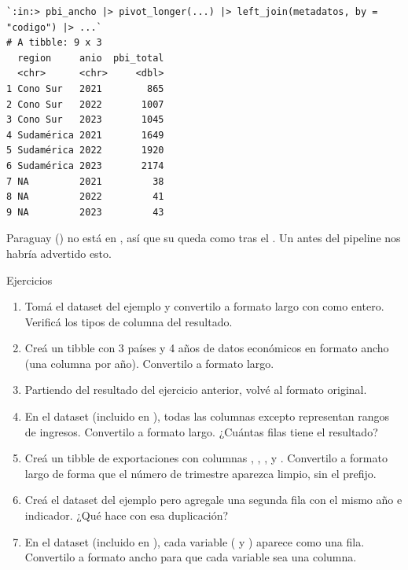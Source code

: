 \documentclass[8pt]{beamer}
\begin{document}
	\begin{frame}[fragile]
\begin{lstlisting}[style=RConsole]
`:in:> pbi_ancho |> pivot_longer(...) |> left_join(metadatos, by = "codigo") |> ...`
# A tibble: 9 x 3
  region     anio  pbi_total
  <chr>      <chr>     <dbl>
1 Cono Sur   2021        865
2 Cono Sur   2022       1007
3 Cono Sur   2023       1045
4 Sudamérica 2021       1649
5 Sudamérica 2022       1920
6 Sudamérica 2023       2174
7 NA         2021         38
8 NA         2022         41
9 NA         2023         43
\end{lstlisting}

		\begin{alertblock}{}
			Paraguay () no está en , así que su  queda como  tras el . Un  antes del pipeline nos habría advertido esto.
		\end{alertblock}
	\end{frame}


	\begin{frame}[fragile]{Ejercicios}
		\begin{enumerate}
			\item Tomá el dataset  del ejemplo y convertilo a formato largo con  como entero. Verificá los tipos de columna del resultado.

			\item Creá un tibble con 3 países y 4 años de datos económicos en formato ancho (una columna por año). Convertilo a formato largo.

			\item Partiendo del resultado del ejercicio anterior, volvé al formato original.

			\item En el dataset  (incluido en ), todas las columnas excepto  representan rangos de ingresos. Convertilo a formato largo. ¿Cuántas filas tiene el resultado?

			\item Creá un tibble de exportaciones con columnas , , ,  y . Convertilo a formato largo de forma que el número de trimestre aparezca limpio, sin el prefijo.

			\item Creá el dataset  del ejemplo pero agregale una segunda fila con el mismo año e indicador. ¿Qué hace  con esa duplicación?

			\item En el dataset  (incluido en ), cada variable ( y ) aparece como una fila. Convertilo a formato ancho para que cada variable sea una columna.
		\end{enumerate}
	\end{frame}
\end{document}
